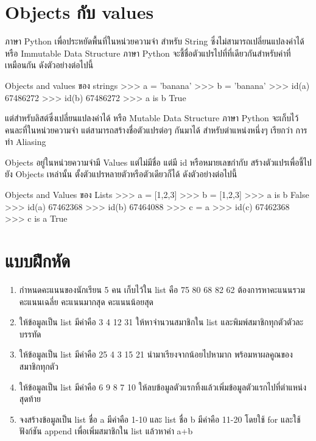 \section{Objects กับ values}

ภาษา Python เพื่อประหยัดพื้นที่ในหน่วยความจำ สำหรับ String ซึ่งไม่สามารถเปลี่ยนแปลงค่าได้ หรือ Immutable Data Structure ภาษา Python จะชี้ชื่อตัวแปรไปที่ที่เดียวกันสำหรับค่าที่เหมือนกัน  ดังตัวอย่างต่อไปนี้

\begin{codelist}{Objects and values ของ strings}{}
>>> a = 'banana'
>>> b = 'banana'
>>> id(a)
67486272
>>> id(b)
67486272
>>> a is b
True
\end{codelist}


แต่สำหรับลิสต์ซึ่งเปลี่ยนแปลงค่าได้ หรือ Mutable Data Structure ภาษา Python จะเก็บไว้คนละที่ในหน่วยความจำ แต่สามารถสร้างชื่อตัวแปรต่อๆ กันมาได้ สำหรับตำแหน่งหนึ่งๆ เรียกว่า การทำ Aliasing

Objects อยู่ในหน่วยความจำมี Values แต่ไม่มีชื่อ แต่มี id หรือหมายเลขกำกับ สร้างตัวแปรเพื่อชี้ไปยัง Objects เหล่านั้น ตั้งตัวแปรหลายตัวหรือตัวเดียวก็ได้ ดังตัวอย่างต่อไปนี้

\begin{codelist}{Objects and Values ของ Lists}{}
>>> a = [1,2,3]
>>> b = [1,2,3]
>>> a is b
False
>>> id(a)
67462368
>>> id(b)
67464088
>>> c = a
>>> id(c)
67462368
>>> c is a
True
\end{codelist}


\section{แบบฝึกหัด}
\begin{enumerate} 
\item กำหนดคะแนนของนักเรียน 5 คน เก็บไว้ใน list คือ 75 80 68 82 62 ต้องการหาคะแนนรวม คะแนนเฉลี่ย คะแนนมากสุด คะแนนน้อยสุด 
\item ให้ข้อมูลเป็น list มีค่าคือ 3 4 12 31 ให้หาจำนวนสมาชิกใน list  และพิมพ์สมาชิกทุกตัวตัวละบรรทัด
\item ให้ข้อมูลเป็น list มีค่าคือ 25 4 3 15 21 นำมาเรียงจากน้อยไปหามาก พร้อมหาผลคูณของสมาชิกทุกตัว
\item ให้ข้อมูลเป็น list มีค่าคือ 6 9 8 7 10 ให้ลบข้อมูลตัวแรกทิ้งแล้วเพิ่มข้อมูลตัวแรกไปที่ตำแหน่งสุดท้าย
\item จงสร้างข้อมูลเป็น list ชื่อ a มีค่าคือ 1-10 และ list ชื่อ b มีค่าคือ 11-20 โดยใช้ for และใช้ฟังก์ชัน append เพื่อเพิ่มสมาชิกใน list แล้วหาค่า a+b
\end{enumerate}


